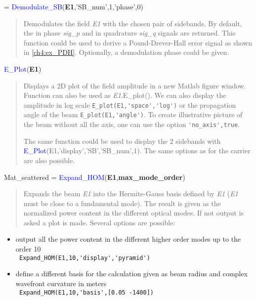  = \textcolor{blue}{Demodulate\_SB}(\textbf{E1},'SB\_num',1,'phase',0)
\vspace*{-0.2cm}
\begin{quote}
Demodulates the field \textsl{E1} with the chosen pair of sidebands. By default, the in phase \textsl{sig\_p} and in quadrature \textsl{sig\_q} signals are returned. This function could be used to derive a Pound-Drever-Hall error signal as shown in \ref{ch4:ex_PDH}. Optionally, a demodulation phase could be given.
\end{quote}

\noindent \textcolor{blue}{E\_Plot}(\textbf{E1})
\vspace*{-0.2cm}
\begin{quote}
Displays a 2D plot of the field amplitude in a new Matlab figure window. Function can also be used as \textsl{E1}.E\_plot(). We can also display the amplitude in log scale \verb?E_plot(E1,'space','log')? or the propagation angle of the beam \verb?E_plot(E1,'angle')?. To create illustrative picture of the beam without all the axis, one can use the option \verb?'no_axis',true?.

The same function could be used to display the 2 sidebands with \textcolor{blue}{E\_Plot}(E1,'display','SB','SB\_num',1). The same options as for the carrier are also possible.
\end{quote}


\noindent Mat\_scattered = \textcolor{blue}{Expand\_HOM}(\textbf{E1},\textbf{max\_mode\_order})
\vspace*{-0.2cm}
\begin{quote}
Expands the beam \textsl{E1} into the Hermite-Gauss basis defined by \textsl{E1} (\textsl{E1} must be close to a fundamental mode). The result is given as the normalized power content in the different optical modes. If not output is asked a plot is made. Several options are possible:
\end{quote}
\begin{itemize}
  \item output all the power content in the different higher order modes up to the order 10 \\
        \verb? Expand_HOM(E1,10,'display','pyramid') ?
  \item define a different basis for the calculation given as beam radius and complex wavefront curvature in meters\\
        \verb? Expand_HOM(E1,10,'basis',[0.05 -1400]) ?
\end{itemize}

